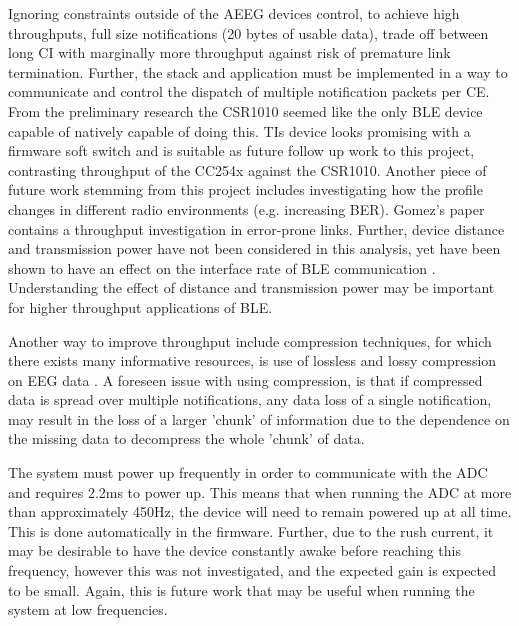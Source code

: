 \documentclass[]{article}
\begin{document}
Ignoring constraints outside of the \ac{AEEG} devices control, to achieve high throughputs, full size notifications (20 bytes of usable data), trade off between long \ac{CI} with marginally more throughput against risk of premature link termination. Further, the stack and application must be implemented in a way to communicate and control the dispatch of multiple notification packets per \ac{CE}. From the preliminary research the CSR1010 seemed like the only \ac{BLE} device capable of natively capable of doing this. \ac{TI}s device looks promising with a firmware soft switch and is suitable as future follow up work to this project, contrasting throughput of the CC254x against the CSR1010. Another piece of future work stemming from this project includes investigating how the profile changes in different radio environments (e.g. increasing \ac{BER}). Gomez's\cite{Gomez2011} paper contains a throughput investigation in error-prone links. Further, device distance and transmission power have not been considered in this analysis, yet have been shown to have an effect on the interface rate of \ac{BLE} communication \cite{Siekkinen2012}. Understanding the effect of distance and transmission power may be important for higher throughput applications of \ac{BLE}.

Another way to improve throughput include compression techniques, for which there exists many informative resources, is use of lossless and lossy compression on \ac{EEG} data \cite{Antoniol1997} \cite{Wongsawat2006}. A foreseen issue with using compression, is that if compressed data is spread over multiple notifications, any data loss of a single notification, may result in the loss of a larger 'chunk' of information due to the dependence on the missing data to decompress the whole 'chunk' of data. 

 The system must power up frequently in order to communicate with the \ac{ADC} and requires 2.2ms to power up. This means that when running the \ac{ADC} at more than approximately 450Hz, the device will need to remain powered up at all time. This is done automatically in the firmware. Further, due to the rush current, it may be desirable to have the device constantly awake before reaching this frequency, however this was not investigated, and the expected gain is expected to be small. Again, this is future work that may be useful when running the system at low frequencies. 
\end{document}
